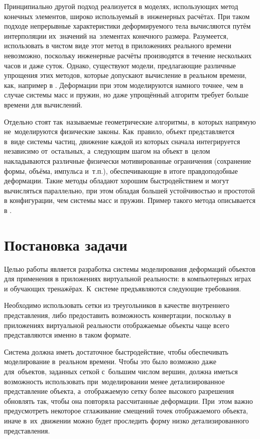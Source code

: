 \documentclass[a4paper,11pt]{report}
\begin{document}
    Принципиально другой подход реализуется в моделях, использующих метод конечных элементов, широко
    используемый в~инженерных расчётах. При таком подходе
    непрерывные характеристики деформируемого тела вычисляются путём интерполяции их~значений
    на~элементах конечного размера. Разумеется, использовать в чистом виде этот метод
    в приложениях реального времени невозможно, поскольку инженерные расчёты производятся в
    течение нескольких часов и даже суток. Однако, существуют модели, предлагающие различные упрощения этих
    методов, которые допускают вычисление в реальном времени, как, например в \cite{mueller-stable}.
    Деформации при этом моделируются намного точнее, чем в случае системы масс и пружин, но даже
    упрощённый алгоритм требует больше времени для вычислений.

    Отдельно стоят так~называемые геометрические алгоритмы, в~которых напрямую не~моделируются
    физические законы. Как~правило, объект представляется в~виде системы частиц, движение каждой из
    которых сначала интегрируется независимо от~остальных, а~следующим шагом на объект в~целом
    накладываются различные физически мотивированные ограничения (сохранение формы, объёма, импульса
    и~т.п.), обеспечивающие в итоге правдоподобные деформации. Такие методы обладают хорошим
    быстродействием и могут вычисляться параллельно, при этом обладая большей устойчивостью и
    простотой в конфигурации, чем системы масс и пружин. Пример такого метода описывается в \cite{mueller-meshless}.

  \chapter{Постановка задачи}

    Целью работы является разработка системы моделирования деформаций объектов для применения в
    приложениях виртуальной реальности: в компьютерных играх и обучающих тренажёрах.
    К~системе предъявляются следующие требования.

    Необходимо использовать сетки из треугольников в качестве внутреннего представления, либо
    предоставить возможность конвертации, поскольку в приложениях виртуальной реальности отображаемые объекты
    чаще всего представляются именно в таком формате.

    Система должна иметь достаточное быстродействие, чтобы обеспечивать моделирование в~реальном
    времени. Чтобы это было возможно даже для~объектов, заданных сеткой с~большим числом вершин,
    должна иметься возможность использовать при~моделировании менее детализированное представление
    объекта, а~отображаемую сетку более высокого разрешения обновлять так, чтобы она повторяла
    рассчитанные деформации. При~этом важно предусмотреть некоторое сглаживание смещений точек
    отображаемого объекта, иначе в~их~движении можно будет проследить форму низко детализированного
    представления.
\end{document}
